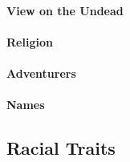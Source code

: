 \paragraph{View on the Undead}

\paragraph{Religion}

\paragraph{Adventurers}

\paragraph{Names}

\subsection{Racial Traits}